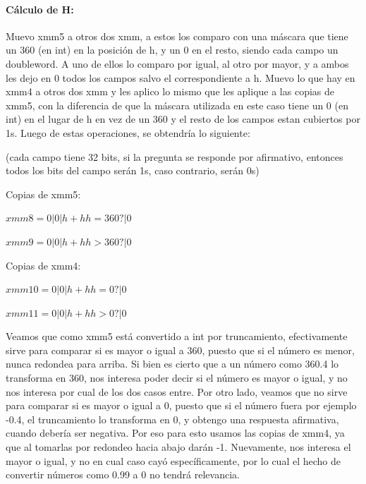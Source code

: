 \documentclass[a4paper]{article}
\begin{document}
\paragraph*{Cálculo de H:}

Muevo xmm5 a otros dos xmm, a estos los comparo con una máscara que tiene un 360 (en int) en la posición de h, y un 0 en el resto, siendo cada campo un doubleword. A uno de ellos lo comparo por igual, al otro por mayor, y a ambos les dejo en 0 todos los campos salvo el correspondiente a h. Muevo lo que hay en xmm4 a otros dos xmm y les aplico lo mismo que les aplique a las copias de xmm5, con la diferencia de que la máscara utilizada en este caso tiene un 0 (en int) en el lugar de h en vez de un 360 y el resto de los campos estan cubiertos por 1s. Luego de estas operaciones, se obtendría lo siguiente:

\vspace*{0.3cm}

(cada campo tiene 32 bits, si la pregunta se responde por afirmativo, entonces todos los bits del campo serán 1s, caso contrario, serán 0s)

\vspace*{0.3cm}

Copias de xmm5:

\vspace*{0.3cm}

$xmm8= 0 | 0 | h+hh = 360? | 0$

\vspace*{0.3cm} 

$xmm9=0 | 0 | h+hh > 360? | 0$

\vspace*{0.3cm}

Copias de xmm4:

\vspace*{0.3cm}

$xmm10= 0 | 0 | h+hh = 0? | 0$

\vspace*{0.3cm}

$xmm11= 0 | 0 | h+hh > 0? | 0$

\vspace*{0.3cm}

Veamos que como xmm5 está convertido a int por truncamiento, efectivamente sirve para comparar si es mayor o igual a 360, puesto que si el número es menor, nunca redondea para arriba. Si bien es cierto que a un número como 360.4 lo transforma en 360, nos interesa poder decir si el número es mayor o igual, y no nos interesa por cual de los dos casos entre. Por otro lado, veamos que no sirve para comparar si es mayor o igual a 0, puesto que si el número fuera por ejemplo -0.4, el truncamiento lo transforma en 0, y obtengo una respuesta afirmativa, cuando debería ser negativa. Por eso para esto usamos las copias de xmm4, ya que al tomarlas por redondeo hacia abajo darán -1. Nuevamente, nos interesa el mayor o igual, y no en cual caso cayó específicamente, por lo cual el hecho de convertir números como 0.99 a 0 no tendrá relevancia.
\end{document}
